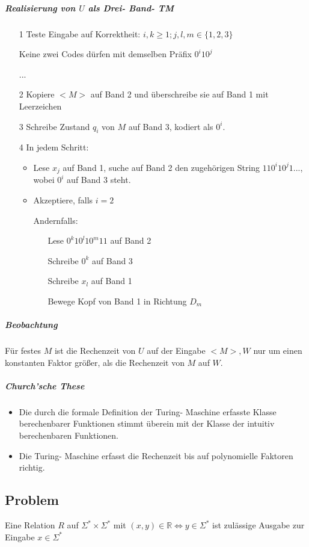 \documentclass[fleqn]{scrartcl}
\begin{document}
\subparagraph{Realisierung von $U$ als Drei- Band- TM}
\begin{itemize}
\item[1] Teste Eingabe auf Korrektheit: $i, k \geq 1; j, l, m \in \{1, 2, 3\}$

Keine zwei Codes dürfen mit demselben Präfix $0^i10^j$

...
\item[2] Kopiere $<M>$ auf Band 2 und überschreibe sie auf Band 1 mit Leerzeichen
\item[3] Schreibe Zustand $q_i$ von $M$ auf Band 3, kodiert als $0^i$.
\item[4] In jedem Schritt:
\begin{itemize}
\item Lese $x_j$ auf Band 1, suche auf Band 2 den zugehörigen String $110^i10^j1...$, wobei $0^i$ auf Band 3 steht.
\item Akzeptiere, falls $i = 2$

Andernfalls: 
\begin{itemize}
\item[] Lese $0^k10^l10^m11$ auf Band 2 
\item[] Schreibe $0^k$ auf Band 3
\item[] Schreibe $x_l$ auf Band 1
\item[] Bewege Kopf von Band 1 in Richtung $D_m$
\end{itemize}
\end{itemize}
\end{itemize}

\subparagraph{Beobachtung}
Für festes $M$ ist die Rechenzeit von $U$ auf der Eingabe $<M>, W$ nur um einen konstanten Faktor größer, als die Rechenzeit von $M$ auf $W$.

\subparagraph{Church'sche These}
\begin{itemize}
\item Die durch die formale Definition der Turing- Maschine erfasste Klasse berechenbarer Funktionen stimmt überein mit der Klasse der intuitiv berechenbaren Funktionen.
\item Die Turing- Maschine erfasst die Rechenzeit bis auf polynomielle Faktoren richtig.
\end{itemize}
\subsection{Problem}
Eine Relation $R$ auf $\Sigma^* \times \Sigma^*$ mit $(x, y) \in \mathbb{R} \Leftrightarrow y \in \Sigma^*$ ist zulässige Ausgabe zur Eingabe $x \in \Sigma^*$
\end{document}
